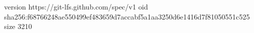version https://git-lfs.github.com/spec/v1
oid sha256:f68766248ae550499ef483659d7accabf5a1aa3250d6e1416d7f81050551c525
size 3210

